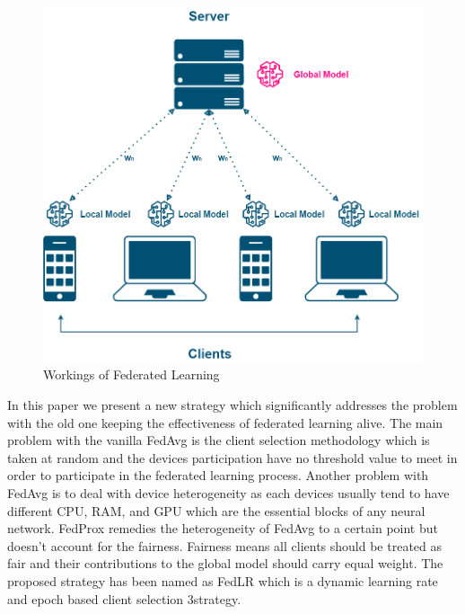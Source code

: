 \documentclass[conference]{IEEEtran}
\begin{document}
\begin{figure}[htp!]
	\centering
	\includegraphics[scale=.25]{Images/FEDLEARN_NEW}
	\caption{Workings of Federated Learning}
	\label{fig1}
\end{figure}

 In this paper we present a new strategy which significantly addresses the problem with the old one keeping the effectiveness of federated learning alive. The main problem with the vanilla FedAvg is the client selection methodology which is taken at random and the devices participation have no threshold value to meet in order to participate in the federated learning process. Another problem with FedAvg is to deal with device heterogeneity as each devices usually tend to have different CPU, RAM, and GPU which are the essential blocks of any neural network. FedProx \cite{li2020federated} remedies the heterogeneity of FedAvg to a certain point but doesn't account for the fairness. Fairness means all clients should be treated as fair and their contributions to the global model should carry equal weight. The proposed strategy has been named as FedLR which is a dynamic learning rate and epoch based client  selection 3strategy.
 
\end{document}

